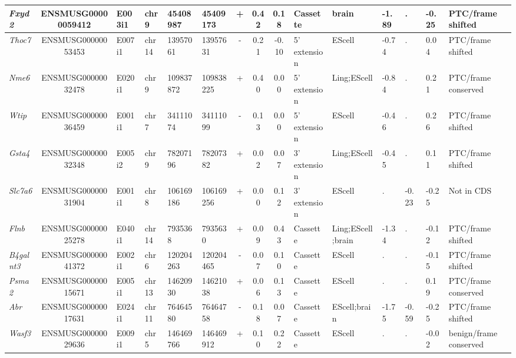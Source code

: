 \begin{landscape}
\begin{table}[htbp]
{\begin{tabular}{|l|c|l|l|l|l|c|c|c|l|l|l|l|l|l|}
		\textit{Fxyd2} & ENSMUSG00000059412 & E003i1 & chr9  & 45408987 & 45409173 & +     & 0.42  & 0.18  & Cassette & brain & -1.89 & .     & -0.25 & PTC/frame shifted \\ \hline
		\textit{Thoc7} & ENSMUSG00000053453 & E007i1 & chr14 & 13957061 & 13957631 & -     & 0.21  & -0.10 & 5' extension & EScell & -0.74 & .     & 0.04  & PTC/frame shifted \\ \hline
		\textit{Nme6} & ENSMUSG00000032478 & E020i1 & chr9  & 109837872 & 109838225 & +     & 0.40  & 0.00  & 5' extension & Ling;EScell & -0.84 & .     & 0.21  & PTC/frame conserved \\ \hline
		\textit{Wtip} & ENSMUSG00000036459 & E001i1 & chr7  & 34111074 & 34111099 & -     & 0.13  & 0.00  & 5' extension & EScell & -0.46 & .     & 0.26  & PTC/frame shifted \\ \hline
		\textit{Gsta4} & ENSMUSG00000032348 & E005i2 & chr9  & 78207196 & 78207382 & +     & 0.02  & 0.07  & 3' extension & Ling;EScell & -0.45 & .     & 0.11  & PTC/frame shifted \\ \hline
		\textit{Slc7a6} & ENSMUSG00000031904 & E001i1 & chr8  & 106169186 & 106169256 & +     & 0.00  & 0.12  & 3' extension & EScell & .     & -0.23 & -0.25 & Not in CDS \\ \hline
		\textit{Flnb} & ENSMUSG00000025278 & E040i1 & chr14 & 7935368 & 7935630 & +     & 0.09  & 0.43  & Cassette & Ling;EScell;brain & -1.34 & .     & -0.12 & PTC/frame shifted \\ \hline
		\textit{B4galnt3} & ENSMUSG00000041372 & E002i1 & chr6  & 120204263 & 120204465 & -     & 0.07  & 0.10  & Cassette & EScell & .     & .     & -0.15 & PTC/frame shifted \\ \hline
		\textit{Psma2} & ENSMUSG00000015671 & E005i1 & chr13 & 14620930 & 14621038 & +     & 0.06  & 0.13  & Cassette & EScell & .     & .     & 0.19  & PTC/frame conserved \\ \hline
		\textit{Abr} & ENSMUSG00000017631 & E024i1 & chr11 & 76464580 & 76464758 & -     & 0.18  & 0.07  & Cassette & EScell;brain & -1.75 & -0.59 & -0.25 & PTC/frame shifted \\ \hline
		\textit{Wasf3} & ENSMUSG00000029636 & E009i1 & chr5  & 146469766 & 146469912 & +     & 0.10  & 0.22  & Cassette & EScell & .     & .     & -0.02 & benign/frame conserved \\ \hline
	\end{tabular}%
	}
\end{table}%

\clearpage


\end{landscape}
